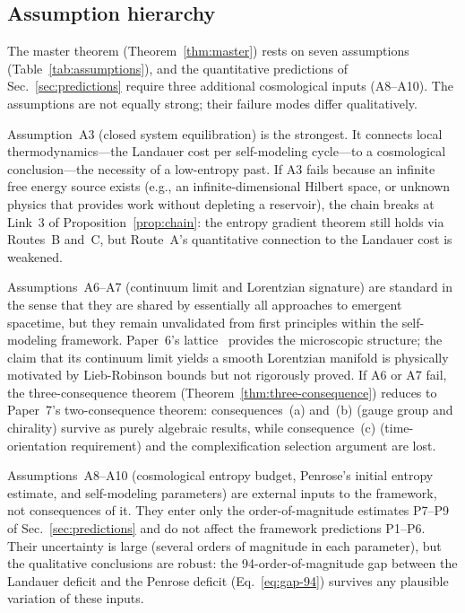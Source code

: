 \subsection{Assumption hierarchy}\label{sec:assumptions-discussion}

The master theorem (Theorem~\ref{thm:master}) rests on seven
assumptions (Table~\ref{tab:assumptions}), and the quantitative
predictions of Sec.~\ref{sec:predictions} require three additional
cosmological inputs (A8--A10).  The assumptions are not equally
strong; their failure modes differ qualitatively.

Assumption~A3 (closed system equilibration) is the strongest.  It
connects local thermodynamics---the Landauer cost per self-modeling
cycle---to a cosmological conclusion---the necessity of a low-entropy
past.  If A3 fails because an infinite free energy source exists
(e.g., an infinite-dimensional Hilbert space, or unknown physics that
provides work without depleting a reservoir), the chain breaks at
Link~3 of Proposition~\ref{prop:chain}: the entropy gradient theorem
still holds via Routes~B and~C, but Route~A's quantitative
connection to the Landauer cost is weakened.

Assumptions~A6--A7 (continuum limit and Lorentzian signature) are
standard in the sense that they are shared by essentially all
approaches to emergent spacetime, but they remain unvalidated from
first principles within the self-modeling framework.  Paper~6's
lattice~\cite{Paper6} provides the microscopic structure; the claim
that its continuum limit yields a smooth Lorentzian manifold is
physically motivated by Lieb-Robinson bounds but not rigorously
proved.  If A6 or A7 fail, the three-consequence theorem
(Theorem~\ref{thm:three-consequence}) reduces to Paper~7's
two-consequence theorem: consequences~(a) and~(b) (gauge group and
chirality) survive as purely algebraic results, while consequence~(c)
(time-orientation requirement) and the complexification selection
argument are lost.

Assumptions~A8--A10 (cosmological entropy budget, Penrose's initial
entropy estimate, and self-modeling parameters) are external inputs to
the framework, not consequences of it.  They enter only the
order-of-magnitude estimates P7--P9 of
Sec.~\ref{sec:predictions} and do not affect the framework
predictions P1--P6.  Their uncertainty is large (several orders of
magnitude in each parameter), but the qualitative conclusions are
robust: the 94-order-of-magnitude gap between the Landauer deficit and
the Penrose deficit (Eq.~\eqref{eq:gap-94}) survives any plausible
variation of these inputs.

